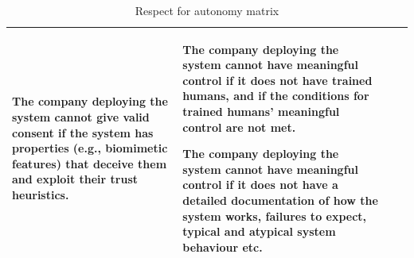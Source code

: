 \documentclass[lettersize,journal]{IEEEtran}
\begin{document}
\begin{landscape}
\begin{table}[]
\begin{tabular}{|p{0.10\textheight}|p{0.35\textheight}|p{0.35\textheight}|p{0.35\textheight}|}
The company deploying the system cannot give valid consent if the system has properties (e.g., biomimetic features) that deceive them and exploit their trust heuristics. &  The company deploying the system cannot have meaningful control if it does not have trained humans, and if the conditions for trained humans’ meaningful control are not met.

The company deploying the system cannot have meaningful control if it does not have a detailed documentation of how the system works, failures to expect, typical and atypical system behaviour etc.\\ \hline 
\end{tabular}
\caption{\label{tab:autonomy}Respect for autonomy matrix}
\end{table}

\end{landscape}
\end{document}
